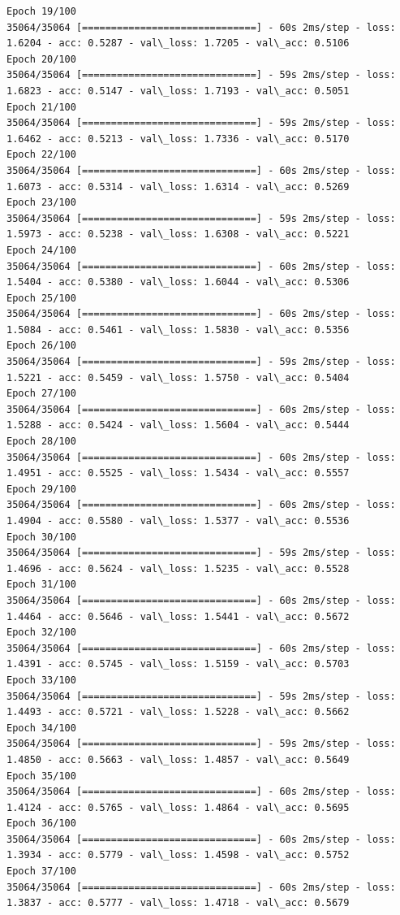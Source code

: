 \documentclass[11pt]{article}
\begin{document}
\begin{Verbatim}[commandchars=\\\{\}]
Epoch 19/100
35064/35064 [==============================] - 60s 2ms/step - loss: 1.6204 - acc: 0.5287 - val\_loss: 1.7205 - val\_acc: 0.5106
Epoch 20/100
35064/35064 [==============================] - 59s 2ms/step - loss: 1.6823 - acc: 0.5147 - val\_loss: 1.7193 - val\_acc: 0.5051
Epoch 21/100
35064/35064 [==============================] - 59s 2ms/step - loss: 1.6462 - acc: 0.5213 - val\_loss: 1.7336 - val\_acc: 0.5170
Epoch 22/100
35064/35064 [==============================] - 60s 2ms/step - loss: 1.6073 - acc: 0.5314 - val\_loss: 1.6314 - val\_acc: 0.5269
Epoch 23/100
35064/35064 [==============================] - 59s 2ms/step - loss: 1.5973 - acc: 0.5238 - val\_loss: 1.6308 - val\_acc: 0.5221
Epoch 24/100
35064/35064 [==============================] - 60s 2ms/step - loss: 1.5404 - acc: 0.5380 - val\_loss: 1.6044 - val\_acc: 0.5306
Epoch 25/100
35064/35064 [==============================] - 60s 2ms/step - loss: 1.5084 - acc: 0.5461 - val\_loss: 1.5830 - val\_acc: 0.5356
Epoch 26/100
35064/35064 [==============================] - 59s 2ms/step - loss: 1.5221 - acc: 0.5459 - val\_loss: 1.5750 - val\_acc: 0.5404
Epoch 27/100
35064/35064 [==============================] - 60s 2ms/step - loss: 1.5288 - acc: 0.5424 - val\_loss: 1.5604 - val\_acc: 0.5444
Epoch 28/100
35064/35064 [==============================] - 60s 2ms/step - loss: 1.4951 - acc: 0.5525 - val\_loss: 1.5434 - val\_acc: 0.5557
Epoch 29/100
35064/35064 [==============================] - 60s 2ms/step - loss: 1.4904 - acc: 0.5580 - val\_loss: 1.5377 - val\_acc: 0.5536
Epoch 30/100
35064/35064 [==============================] - 59s 2ms/step - loss: 1.4696 - acc: 0.5624 - val\_loss: 1.5235 - val\_acc: 0.5528
Epoch 31/100
35064/35064 [==============================] - 60s 2ms/step - loss: 1.4464 - acc: 0.5646 - val\_loss: 1.5441 - val\_acc: 0.5672
Epoch 32/100
35064/35064 [==============================] - 60s 2ms/step - loss: 1.4391 - acc: 0.5745 - val\_loss: 1.5159 - val\_acc: 0.5703
Epoch 33/100
35064/35064 [==============================] - 59s 2ms/step - loss: 1.4493 - acc: 0.5721 - val\_loss: 1.5228 - val\_acc: 0.5662
Epoch 34/100
35064/35064 [==============================] - 59s 2ms/step - loss: 1.4850 - acc: 0.5663 - val\_loss: 1.4857 - val\_acc: 0.5649
Epoch 35/100
35064/35064 [==============================] - 60s 2ms/step - loss: 1.4124 - acc: 0.5765 - val\_loss: 1.4864 - val\_acc: 0.5695
Epoch 36/100
35064/35064 [==============================] - 60s 2ms/step - loss: 1.3934 - acc: 0.5779 - val\_loss: 1.4598 - val\_acc: 0.5752
Epoch 37/100
35064/35064 [==============================] - 60s 2ms/step - loss: 1.3837 - acc: 0.5777 - val\_loss: 1.4718 - val\_acc: 0.5679

\end{Verbatim}
\end{document}
